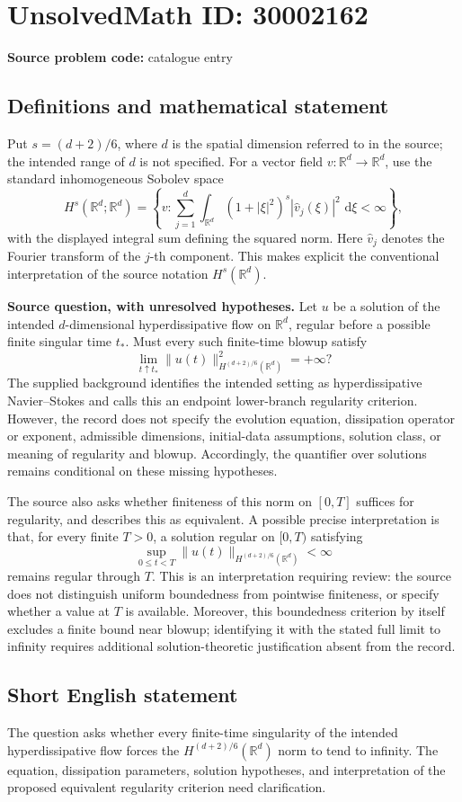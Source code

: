 \documentclass[11pt]{article}
\newcommand{\R}{\mathbb{R}}
\newcommand{\dd}{\,\mathrm{d}}
\begin{document}
\section*{UnsolvedMath ID: 30002162}
\textbf{Source problem code:} catalogue entry
\subsection{Definitions and mathematical statement}
Put \(s=(d+2)/6\), where \(d\) is the spatial dimension referred to in the source; the intended range of \(d\) is not specified. For a vector field \(v\colon\R^d\to\R^d\), use the standard inhomogeneous Sobolev space
\[
H^s(\R^d;\R^d)=\left\{v:\sum_{j=1}^d\int_{\R^d}(1+|\xi|^2)^s|\widehat v_j(\xi)|^2\,\dd\xi<\infty\right\},
\]
with the displayed integral sum defining the squared norm. Here \(\widehat v_j\) denotes the Fourier transform of the \(j\)-th component. This makes explicit the conventional interpretation of the source notation \(H^s(\R^d)\).

\textbf{Source question, with unresolved hypotheses.} Let \(u\) be a solution of the intended \(d\)-dimensional hyperdissipative flow on \(\R^d\), regular before a possible finite singular time \(t_*\). Must every such finite-time blowup satisfy
\[
\lim_{t\uparrow t_*}\|u(t)\|_{H^{(d+2)/6}(\R^d)}^2=+\infty?
\]
The supplied background identifies the intended setting as hyperdissipative Navier--Stokes and calls this an endpoint lower-branch regularity criterion. However, the record does not specify the evolution equation, dissipation operator or exponent, admissible dimensions, initial-data assumptions, solution class, or meaning of regularity and blowup. Accordingly, the quantifier over solutions remains conditional on these missing hypotheses.

The source also asks whether finiteness of this norm on \([0,T]\) suffices for regularity, and describes this as equivalent. A possible precise interpretation is that, for every finite \(T>0\), a solution regular on \([0,T)\) satisfying
\[
\sup_{0\le t<T}\|u(t)\|_{H^{(d+2)/6}(\R^d)}<\infty
\]
remains regular through \(T\). This is an interpretation requiring review: the source does not distinguish uniform boundedness from pointwise finiteness, or specify whether a value at \(T\) is available. Moreover, this boundedness criterion by itself excludes a finite bound near blowup; identifying it with the stated full limit to infinity requires additional solution-theoretic justification absent from the record.
\subsection{Short English statement}
The question asks whether every finite-time singularity of the intended hyperdissipative flow forces the \(H^{(d+2)/6}(\R^d)\) norm to tend to infinity. The equation, dissipation parameters, solution hypotheses, and interpretation of the proposed equivalent regularity criterion need clarification.
\end{document}

